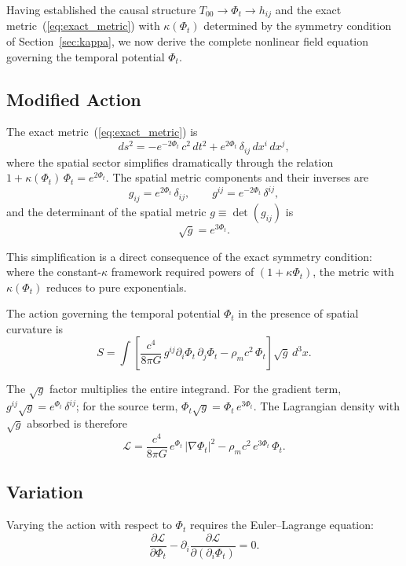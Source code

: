 \documentclass[12pt]{article}
\begin{document}
Having established the causal structure $T_{00} \to \Phi_t \to h_{ij}$ and the exact metric~(\ref{eq:exact_metric}) with $\kappa(\Phi_t)$ determined by the symmetry condition of Section~\ref{sec:kappa}, we now derive the complete nonlinear field equation governing the temporal potential $\Phi_t$.

\subsection{Modified Action}
\label{sec:modified_action}

The exact metric~(\ref{eq:exact_metric}) is
$$
ds^2 = -e^{-2\Phi_t}\,c^2\,dt^2 + e^{2\Phi_t}\,\delta_{ij}\,dx^i\,dx^j,
$$
where the spatial sector simplifies dramatically through the relation $1 + \kappa(\Phi_t)\,\Phi_t = e^{2\Phi_t}$. The spatial metric components and their inverses are
$$
g_{ij} = e^{2\Phi_t}\,\delta_{ij}, \qquad g^{ij} = e^{-2\Phi_t}\,\delta^{ij},
$$
and the determinant of the spatial metric $g \equiv \det(g_{ij})$ is
$$
\sqrt{g} = e^{3\Phi_t}.
$$

This simplification is a direct consequence of the exact symmetry condition: where the constant-$\kappa$ framework required powers of $(1+\kappa\Phi_t)$, the metric with $\kappa(\Phi_t)$ reduces to pure exponentials.

The action governing the temporal potential $\Phi_t$ in the presence of spatial curvature is
\begin{equation}
S = \int\left[\frac{c^4}{8\pi G}\,g^{ij}\partial_i\Phi_t\,\partial_j\Phi_t - \rho_m c^2\,\Phi_t\right]\sqrt{g}\,d^3x.
\end{equation}

The $\sqrt{g}$ factor multiplies the entire integrand. For the gradient term, $g^{ij}\sqrt{g} = e^{\Phi_t}\,\delta^{ij}$; for the source term, $\Phi_t\sqrt{g} = \Phi_t\,e^{3\Phi_t}$. The Lagrangian density with $\sqrt{g}$ absorbed is therefore
\begin{equation}
\mathcal{L} = \frac{c^4}{8\pi G}\,e^{\Phi_t}\,|\nabla\Phi_t|^2 - \rho_m c^2\,e^{3\Phi_t}\,\Phi_t.
\end{equation}

\subsection{Variation}
\label{sec:variation}

Varying the action with respect to $\Phi_t$ requires the Euler--Lagrange equation:
$$
\frac{\partial \mathcal{L}}{\partial \Phi_t} - \partial_i\frac{\partial \mathcal{L}}{\partial(\partial_i \Phi_t)} = 0.
$$
\end{document}
